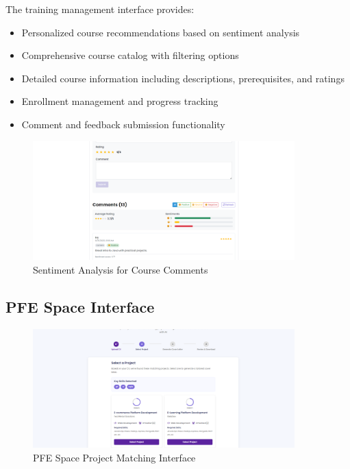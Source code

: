 \documentclass[12pt,a4paper]{report}
\begin{document}
The training management interface provides:

\begin{itemize}
    \item Personalized course recommendations based on sentiment analysis
    \item Comprehensive course catalog with filtering options
    \item Detailed course information including descriptions, prerequisites, and ratings
    \item Enrollment management and progress tracking
    \item Comment and feedback submission functionality
\end{itemize}

\begin{figure}[!htbp]
\centering
\includegraphics[width=0.9\textwidth]{media/sentiment analysis.png}
\caption{Sentiment Analysis for Course Comments}
\label{fig:sentiment-analysis}
\end{figure}

\subsection{PFE Space Interface}

\begin{figure}[!htbp]
\centering
\includegraphics[width=0.9\textwidth]{media/project match.png}
\caption{PFE Space Project Matching Interface}
\label{fig:pfe-interface}
\end{figure}
\end{document}
